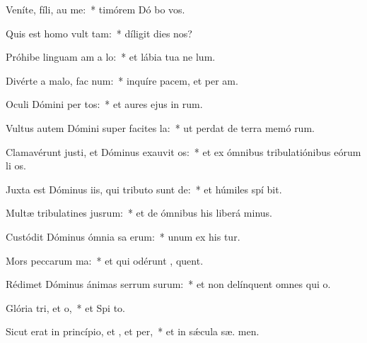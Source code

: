 \item Veníte, fíli, au me:~* timórem Dó bo vos.
\item Quis est homo  vult tam:~* díligit dies  nos?
\item Próhibe linguam am a lo:~* et lábia tua ne  lum.
\item Divérte a malo,  fac num:~* inquíre pacem, et per am.
\item Oculi Dómini per tos:~* et aures ejus in  rum.
\item Vultus autem Dómini super facites la:~* ut perdat de terra memó rum.
\item Clamavérunt justi, et Dóminus exauvit os:~* et ex ómnibus tribulatiónibus eórum li os.
\item Juxta est Dóminus iis, qui tributo sunt de:~* et húmiles spí bit.
\item Multæ tribulatines jusrum:~* et de ómnibus his liberá  minus.
\item Custódit Dóminus ómnia sa erum:~* unum ex his  tur.
\item Mors peccarum ma:~* et qui odérunt , quent.
\item Rédimet Dóminus ánimas serrum surum:~* et non delínquent omnes qui   o.
\item Glória tri, et o,~* et Spi to.
\item Sicut erat in princípio, et , et per,~* et in sǽcula sæ. men.
